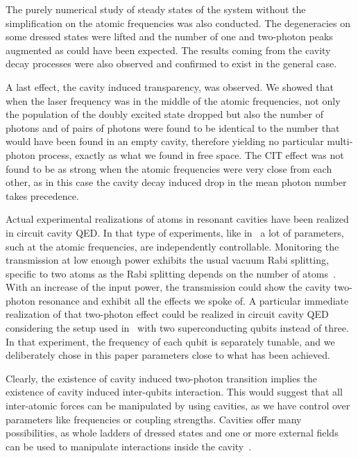The purely numerical study of steady states of the system without the simplification on the atomic frequencies was also conducted. The degeneracies on some dressed states were lifted and the number of one and two-photon peaks augmented as could have been expected. The results coming from the cavity decay processes were also observed and confirmed to exist in the general case. 

A last effect, the cavity induced transparency, was observed. We showed that when the laser frequency was in the middle of the atomic frequencies, not only the population of the doubly excited state dropped but also the number of photons and of pairs of photons were found to be identical to the number that would have been found in an empty cavity, therefore yielding no particular multi-photon process, exactly as what we found in free space. The CIT effect was not found to be as strong when the atomic frequencies were very close from each other, as in this case the cavity decay induced drop in the mean photon number takes precedence.

Actual experimental realizations of atoms in resonant cavities have been realized in circuit cavity QED. In that type of experiments, like in~\cite{Fin08, Fin09,Bau09} a lot of parameters, such at the atomic frequencies, are independently controllable. Monitoring the transmission at low enough power exhibits the usual vacuum Rabi splitting, specific to two atoms as the Rabi splitting depends on the number of atoms~\cite{San83, Aga84, Rai89, Boc04, Mau05, tho98}. With an increase of the input power, the transmission could show the cavity two-photon resonance and exhibit all the effects we spoke of. A particular immediate realization of that two-photon effect could be realized in circuit cavity QED considering the setup used in~\cite{Fin09} with two superconducting qubits instead of three. In that experiment, the frequency of each qubit is separately tunable, and we deliberately chose in this paper parameters close to what has been achieved.

Clearly, the existence of cavity induced two-photon transition implies the existence of cavity induced inter-qubits interaction. This would suggest that all inter-atomic forces can be manipulated by using cavities, as we have control over parameters like frequencies or coupling strengths. Cavities offer many possibilities, as whole ladders of dressed states and one or more external fields can be used to manipulate interactions inside the cavity~\cite{sol03, Bir05}.

